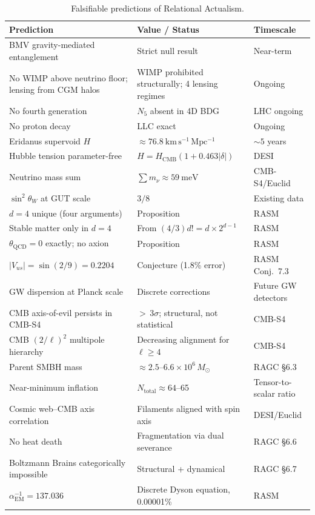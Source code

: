 \documentclass[11pt,a4paper]{article}
\begin{document}
\begin{table}[ht]
\centering
\caption{Falsifiable predictions of Relational Actualism.}
\label{tab:predictions}
\renewcommand{\arraystretch}{1.3}
\begin{tabular}{p{5.2cm}p{4.5cm}p{3.5cm}}
\toprule
Prediction & Value / Status & Timescale \\
\midrule
BMV gravity-mediated entanglement & Strict null result & Near-term \\
No WIMP above neutrino floor; lensing from CGM halos & WIMP prohibited structurally; 4 lensing regimes & Ongoing \\
No fourth generation & $N_5$ absent in 4D BDG & LHC ongoing \\
No proton decay & LLC exact & Ongoing \\
Eridanus supervoid $H$ & $\approx 76.8~\mathrm{km\,s^{-1}\,Mpc^{-1}}$ & $\sim 5$ years \\
Hubble tension parameter-free & $H = H_{\mathrm{CMB}}(1+0.463|\delta|)$ & DESI \\
Neutrino mass sum & $\sum m_\nu \approx 59~\mathrm{meV}$ & CMB-S4/Euclid \\
$\sin^2\theta_W$ at GUT scale & $3/8$ & Existing data \\
$d = 4$ unique (four arguments) & Proposition & RASM \\
Stable matter only in $d=4$ & From $(4/3)d! = d\times 2^{d-1}$ & RASM \\
$\theta_{\mathrm{QCD}} = 0$ exactly; no axion & Proposition & RASM \\
$|V_{us}| = \sin(2/9) = 0.2204$ & Conjecture (1.8\% error) & RASM Conj.~7.3 \\
GW dispersion at Planck scale & Discrete corrections & Future GW detectors \\
CMB axis-of-evil persists in CMB-S4 & ${>}\,3\sigma$; structural, not statistical & CMB-S4 \\
CMB $(2/\ell)^2$ multipole hierarchy & Decreasing alignment for $\ell \geq 4$ & CMB-S4 \\
Parent SMBH mass & $\approx 2.5$--$6.6 \times 10^6\,M_\odot$ & RAGC \S6.3 \\
Near-minimum inflation & $N_{\mathrm{total}} \approx 64$--65 & Tensor-to-scalar ratio \\
Cosmic web--CMB axis correlation & Filaments aligned with spin axis & DESI/Euclid \\
No heat death & Fragmentation via dual severance & RAGC \S6.6 \\
Boltzmann Brains categorically impossible & Structural + dynamical & RAGC \S6.7 \\
$\alpha_{\mathrm{EM}}^{-1} = 137.036$ & Discrete Dyson equation, 0.00001\% & RASM \\
\bottomrule
\end{tabular}
\end{table}
\end{document}
